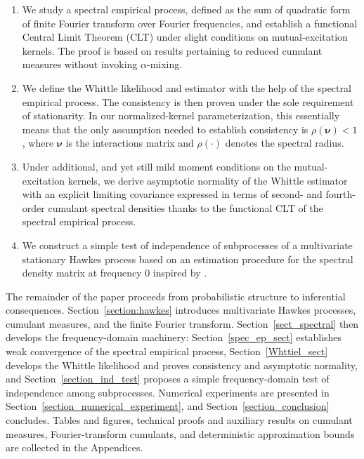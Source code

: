 \documentclass[11pt]{article}
\numberwithin{equation}{section}
\theoremstyle{plain}
\theoremstyle{definition}
\theoremstyle{definition}
\theoremstyle{assumption}
\theoremstyle{proposition}
\theoremstyle{proposition}
\theoremstyle{example}
\theoremstyle{lemma}
\theoremstyle{theorem}
\theoremstyle{remark}
\begin{document}
\begin{enumerate}
    \item We study a spectral empirical process, defined as the sum of quadratic form of finite Fourier transform over Fourier frequencies, and establish a functional Central Limit Theorem (CLT) under slight conditions on mutual-excitation kernels. The proof is based on results pertaining to reduced cumulant measures without invoking $\alpha$-mixing.
    \item We define the Whittle likelihood and estimator with the help of the spectral empirical process. The consistency is then proven under the sole requirement of stationarity. In our normalized-kernel parameterization, this essentially means that the only assumption needed to establish consistency is $\rho(\boldsymbol{\nu})<1$, where  $\boldsymbol{\nu}$ is the interactions matrix and $\rho(\cdot)$ denotes the spectral radius.
    \item Under additional, and yet still mild moment conditions on the mutual-excitation kernels, we derive asymptotic normality of the Whittle estimator with an explicit limiting covariance expressed in terms of second- and fourth-order cumulant spectral densities thanks to the functional CLT of the spectral empirical process.
    \item We construct a simple test of independence of subprocesses of a multivariate stationary Hawkes process based on an estimation procedure for the spectral density matrix at frequency $0$ inspired by \citet{McElroy_and_Politis2025}.
\end{enumerate}

The remainder of the paper proceeds from probabilistic structure to inferential consequences. Section~\ref{section:hawkes} introduces multivariate Hawkes processes, cumulant measures, and the finite Fourier transform. Section~\ref{sect_spectral} then develops the frequency-domain machinery: Section~\ref{spec_ep_sect} establishes weak convergence of the spectral empirical process, Section~\ref{Whttiel_sect} develops the Whittle likelihood and proves consistency and asymptotic normality, and Section~\ref{section_ind_test} proposes a simple frequency-domain test of independence among subprocesses. Numerical experiments are presented in Section~\ref{section_numerical_experiment}, and Section~\ref{section_conclusion} concludes. Tables and figures, technical proofs and auxiliary results on cumulant measures, Fourier-transform cumulants, and deterministic approximation bounds are collected in the Appendices.
\end{document}
